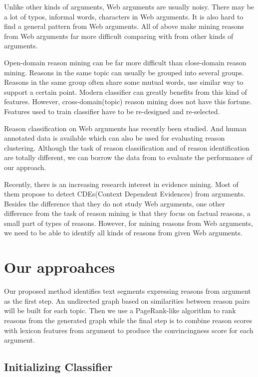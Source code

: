 \documentclass[11pt,a4paper]{article}
\begin{document}
Unlike other kinds of arguments, Web arguments are usually noisy\cite{habernal2016argument}. There may be a lot of typos, informal words, characters in Web arguments. It is also hard to find a general pattern from Web arguments. All of above make mining reasons from Web arguments far more difficult comparing with from other kinds of arguments.

Open-domain reason mining can be far more difficult than close-domain reason mining. Reasons in the same topic can usually be grouped into several groups\cite{hasan2014you}. Reasons in the same group often share some mutual words, use similar way to support a certain point. Modern classifier can greatly benefits from this kind of features. However, cross-domain(topic) reason mining does not have this fortune. Features used to train classifier have to be re-designed and re-selected. 

Reason classification on Web arguments has recently been studied\cite{hasan2014you}. And human annotated data is available which can also be used for evaluating reason clustering. Although the task of reason classification and of reason identification are totally different, we can borrow the data from \cite{hasan2014you} to evaluate the performance of our approach. 

Recently, there is an increasing research interest in evidence mining\cite{cartright2011evidence, rinott2015show, aharoni2014benchmark}. Most of them propose to detect CDEs(Context Dependent Evidences) from arguments. Besides the difference that they do not study Web arguments, one other difference from the task of reason mining is that they focus on factual reasons, a small part of types of reasons. However, for mining reasons from Web arguments, we need to be able to identify all kinds of reasons from given Web arguments.  

\section{Our approahces}
\label{sec:approach}

Our proposed method identifies text segments expressing reasons from argument as the first step. An undirected graph based on similarities between reason pairs will be built for each topic. Then we use a PageRank-like algorithm to rank reasons from the generated graph while the final step is to combine reason scores with lexicon features from argument to produce the convincingness score for each argument.  

\subsection{Initializing Classifier}
\end{document}
